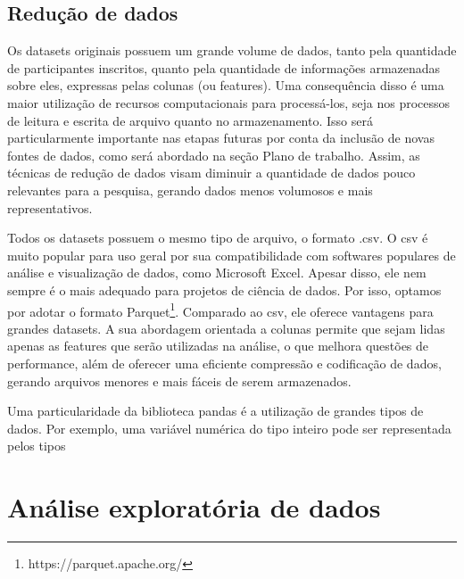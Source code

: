 \subsection{Redução de dados}
Os datasets originais possuem um grande volume de dados, tanto pela quantidade de participantes inscritos, quanto pela quantidade de informações armazenadas sobre eles, expressas pelas colunas (ou features). Uma consequência disso é uma maior utilização de recursos computacionais para processá-los, seja nos processos de leitura e escrita de arquivo quanto no armazenamento. Isso será particularmente importante nas etapas futuras por conta da inclusão de novas fontes de dados, como será abordado na seção Plano de trabalho. Assim, as técnicas de redução de dados visam diminuir a quantidade de dados pouco relevantes para a pesquisa, gerando dados menos volumosos e mais representativos. 

Todos os datasets possuem o mesmo tipo de arquivo, o formato .csv. O csv é muito popular para uso geral por sua compatibilidade com softwares populares de análise e visualização de dados, como Microsoft Excel. Apesar disso, ele nem sempre é o mais adequado para projetos de ciência de dados. Por isso, optamos por adotar o formato Parquet\footnote{https://parquet.apache.org/}. Comparado ao csv, ele oferece vantagens para grandes datasets. A sua abordagem orientada a colunas permite que sejam lidas apenas as features que serão utilizadas na análise, o que melhora questões de performance, além de oferecer uma eficiente compressão e codificação de dados, gerando arquivos menores e mais fáceis de serem armazenados.

Uma particularidade da biblioteca pandas é a utilização de grandes tipos de dados. Por exemplo, uma variável numérica do tipo inteiro pode ser representada pelos tipos 

\subsection{}

\section{Análise exploratória de dados}







